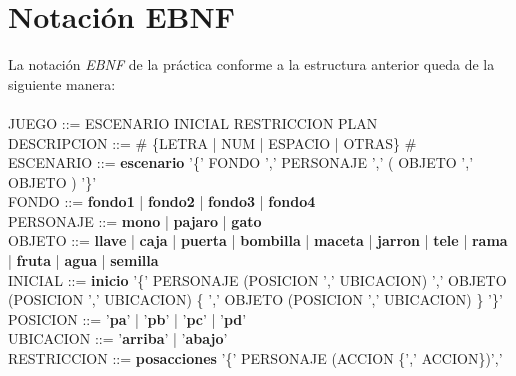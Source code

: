 \documentclass[11pt,a4paper,spanish,twoside]{book}
\theoremstyle{plain} \newtheorem{nota}{Nota}
\begin{document}
\chapter{Notación EBNF}
La notación \emph{EBNF} de la práctica conforme a la estructura anterior queda 
de la siguiente manera:
\\ 
\\
JUEGO ::= ESCENARIO INICIAL RESTRICCION PLAN
\\
DESCRIPCION ::= \# \{LETRA | NUM | ESPACIO | OTRAS\} \#
\\
ESCENARIO ::= \textbf{escenario} '\{' FONDO ',' PERSONAJE ',' ( OBJETO { ',' 
OBJETO} ) '\}'
\\
FONDO ::= \textbf{fondo1} | \textbf{fondo2} | \textbf{fondo3} | \textbf{fondo4}
\\
PERSONAJE ::= \textbf{mono} | \textbf{pajaro} | \textbf{gato} 
\\
OBJETO ::= \textbf{llave} | \textbf{caja} | \textbf{puerta} | \textbf{bombilla}
 | \textbf{maceta} | \textbf{jarron} | \textbf{tele} | \textbf{rama} | 
\textbf{fruta} | \textbf{agua} | \textbf{semilla} 
\\
INICIAL ::= \textbf{inicio} '\{' PERSONAJE (POSICION ',' UBICACION) ',' OBJETO 
(POSICION ',' UBICACION) \{ ',' OBJETO (POSICION ',' UBICACION) \} '\}'
\\
POSICION ::= '\textbf{pa}' | '\textbf{pb}' | '\textbf{pc}' | '\textbf{pd}'
\\
UBICACION ::= '\textbf{arriba}' | '\textbf{abajo}'
\\
RESTRICCION ::= \textbf{posacciones} '\{' PERSONAJE (ACCION \{',' ACCION\})',' 
\end{document}
